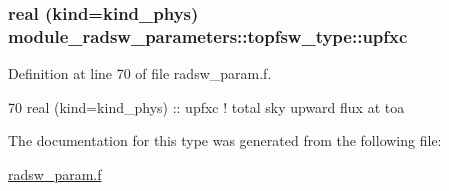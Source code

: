 \subsubsection[{\texorpdfstring{upfxc}{upfxc}}]{\setlength{\rightskip}{0pt plus 5cm}real (kind=kind\+\_\+phys) module\+\_\+radsw\+\_\+parameters\+::topfsw\+\_\+type\+::upfxc}\hypertarget{structmodule__radsw__parameters_1_1topfsw__type_a444a7fd67ff2c22403779a5e83eef09b}{}\label{structmodule__radsw__parameters_1_1topfsw__type_a444a7fd67ff2c22403779a5e83eef09b}


Definition at line 70 of file radsw\+\_\+param.\+f.


\begin{DoxyCode}
70         \textcolor{keywordtype}{real (kind=kind\_phys)} :: upfxc         \textcolor{comment}{! total sky upward flux at toa}
\end{DoxyCode}


The documentation for this type was generated from the following file\+:\begin{DoxyCompactItemize}
\item 
\hyperlink{radsw__param_8f}{radsw\+\_\+param.\+f}\end{DoxyCompactItemize}
